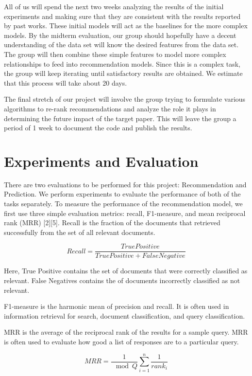 \documentclass[journal]{IEEEtran}
\begin{document}
All of us will spend the next two weeks analyzing the results of the initial experiments and making sure that they are consistent with the results reported by past works.  These initial models will act as the baselines for the more complex models. By the midterm evaluation, our group should hopefully have a decent understanding of the data set will know the desired features from the data set.  The group will then combine these simple features to model more complex relationships to feed into recommendation models.  Since this is a complex task, the group will keep iterating until satisfactory results are obtained.  We estimate that this process will take about 20 days.  

The final stretch of our project will involve the group trying to formulate various algorithms to re-rank recommendations and analyze the role it plays in determining the future impact of the target paper.  This will leave the group a period of 1 week to document the code and publish the results.

\section{Experiments and Evaluation}
There are two evaluations to be performed for this project: Recommendation and Prediction.  We perform experiments to evaluate the performance of both of the tasks separately.  To measure the performance of the recommendation model, we first use three simple evaluation metrics: recall, F1-measure, and mean reciprocal rank (MRR) [2][5].  Recall is the fraction of the documents that retrieved successfully from the set of all relevant documents.  

\begin{equation}
Recall = \frac{True Positive}{True Positive + False Negative}
\end{equation}

Here, True Positive contains the set of documents that were correctly classified as relevant.  False Negatives contains the of documents incorrectly classified as not relevant. 

F1-measure is the harmonic mean of precision and recall.  It is often used in information retrieval for search, document classification, and query classification. 

MRR is the average of the reciprocal rank of the results for a sample query. MRR is often used to evaluate how good a list of responses are to a particular query. 

\begin{equation}
MRR = \frac{1}{\mod{Q}}\sum\limits_{i=1}^n\frac{1}{rank_{i}}
\end{equation}
\end{document}
